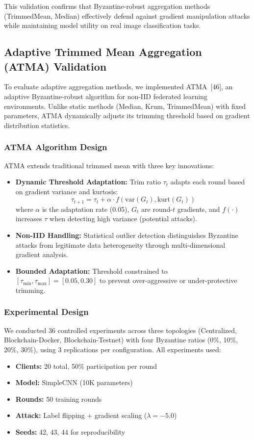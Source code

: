 \documentclass[12pt,a4paper,onecolumn]{article}
\begin{document}
This validation confirms that Byzantine-robust aggregation methods (TrimmedMean, Median) effectively defend against gradient manipulation attacks while maintaining model utility on real image classification tasks.

\subsection{Adaptive Trimmed Mean Aggregation (ATMA) Validation}

To evaluate adaptive aggregation methods, we implemented ATMA~[46], an adaptive Byzantine-robust algorithm for non-IID federated learning environments. Unlike static methods (Median, Krum, TrimmedMean) with fixed parameters, ATMA dynamically adjusts its trimming threshold based on gradient distribution statistics.

\subsubsection{ATMA Algorithm Design}

ATMA extends traditional trimmed mean with three key innovations:
\begin{itemize}
    \item \textbf{Dynamic Threshold Adaptation:} Trim ratio $\tau_t$ adapts each round based on gradient variance and kurtosis:
    $$\tau_{t+1} = \tau_t + \alpha \cdot f(\text{var}(G_t), \text{kurt}(G_t))$$
    where $\alpha$ is the adaptation rate (0.05), $G_t$ are round-$t$ gradients, and $f(\cdot)$ increases $\tau$ when detecting high variance (potential attacks).
    
    \item \textbf{Non-IID Handling:} Statistical outlier detection distinguishes Byzantine attacks from legitimate data heterogeneity through multi-dimensional gradient analysis.
    
    \item \textbf{Bounded Adaptation:} Threshold constrained to $[\tau_{\min}, \tau_{\max}] = [0.05, 0.30]$ to prevent over-aggressive or under-protective trimming.
\end{itemize}

\subsubsection{Experimental Design}

We conducted 36 controlled experiments across three topologies (Centralized, Blockchain-Docker, Blockchain-Testnet) with four Byzantine ratios (0\%, 10\%, 20\%, 30\%), using 3 replications per configuration. All experiments used:
\begin{itemize}
    \item \textbf{Clients:} 20 total, 50\% participation per round
    \item \textbf{Model:} SimpleCNN (10K parameters)
    \item \textbf{Rounds:} 50 training rounds
    \item \textbf{Attack:} Label flipping + gradient scaling ($\lambda = -5.0$)
    \item \textbf{Seeds:} 42, 43, 44 for reproducibility
\end{itemize}
\end{document}
